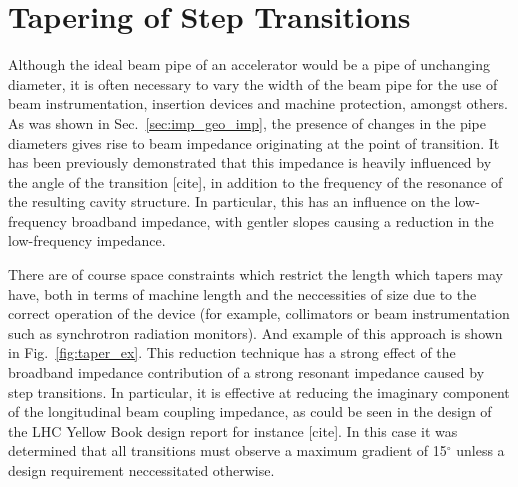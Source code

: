 \section{Tapering of Step Transitions}
\label{sec:step_ins}

Although the ideal beam pipe of an accelerator would be a pipe of unchanging diameter, it is often necessary to vary the width of the beam pipe for the use of beam instrumentation, insertion devices and machine protection, amongst others. As was shown in Sec.~\ref{sec:imp_geo_imp}, the presence of changes in the pipe diameters gives rise to beam impedance originating at the point of transition. It has been previously demonstrated that this impedance is heavily influenced by the angle of the transition [cite], in addition to the frequency of the resonance of the resulting cavity structure. In particular, this has an influence on the low-frequency broadband impedance, with gentler slopes causing a reduction in the low-frequency impedance. 

There are of course space constraints which restrict the length which tapers may have, both in terms of machine length and the neccessities of size due to the correct operation of the device (for example, collimators or beam instrumentation such as synchrotron radiation monitors). And example of this approach is shown in Fig.~\ref{fig:taper_ex}. This reduction technique has a strong effect of the broadband impedance contribution of a strong resonant impedance caused by step transitions. In particular, it is effective at reducing the imaginary component of the longitudinal beam coupling impedance, as could be seen in the design of the LHC Yellow Book design report for instance [cite]. In this case it was determined that all transitions must observe a maximum gradient of 15$^{\circ}$ unless a design requirement neccessitated otherwise.

